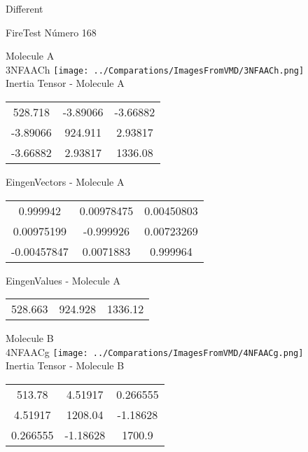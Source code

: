\begin{center}
\vtab
\vtab
\textcolor{NavyBlue}{\Large Different}
\end{center}

 \newpage

\vtab[-2cm]
\begin{center}
{\large FireTest \tab Número 168}
\end{center}
\begin{multicols}{2}
\begin{center}

Molecule A \\ 
3NFAACh
\texttt{[image: ../Comparations/ImagesFromVMD/3NFAACh.png]}
\\
Inertia Tensor - Molecule A \\
\vtab

\begin{tabular}{|c c c|}
528.718	 & 	-3.89066	 & 	-3.66882	 \\
-3.89066	 & 	924.911	 & 	2.93817	 \\
-3.66882	 & 	2.93817	 & 	1336.08
\end{tabular}

\vtab
 EingenVectors - Molecule A     \\
\vtab
\begin{tabular}{|c c c|}
0.999942	 & 	0.00978475	 & 	0.00450803	 \\
0.00975199	 & 	-0.999926	 & 	0.00723269	 \\
-0.00457847	 & 	0.0071883	 & 	0.999964
\end{tabular}

\vtab
 EingenValues - Molecule A     \\
\vtab
\begin{tabular}{|c c c|}
528.663	 & 	924.928	 & 	1336.12	 \\
\end{tabular}
\columnbreak

Molecule B \\ 
4NFAACg
\texttt{[image: ../Comparations/ImagesFromVMD/4NFAACg.png]}
\\
Inertia Tensor - Molecule B \\
\vtab

\begin{tabular}{|c c c|}
513.78	 & 	4.51917	 & 	0.266555	 \\
4.51917	 & 	1208.04	 & 	-1.18628	 \\
0.266555	 & 	-1.18628	 & 	1700.9
\end{tabular}


\end{center}
\end{multicols}
